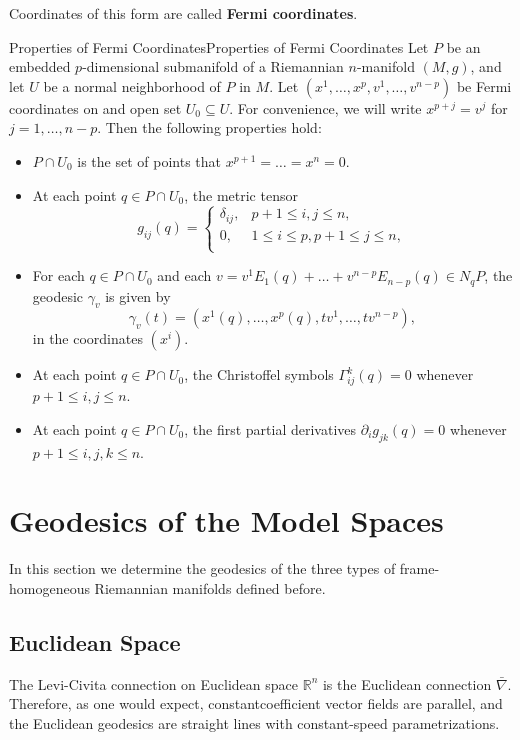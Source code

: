 \documentclass[../main.tex]{subfiles}
\begin{document}
Coordinates of this form are called \textbf{Fermi coordinates}.

\begin{proposition}{Properties of Fermi Coordinates}{Properties of Fermi Coordinates}
	Let $P$ be an embedded $p$-dimensional submanifold of a Riemannian $n$-manifold $(M, g)$, and let $U$ be a normal neighborhood of $P$ in $M$. Let $(x^1, \ldots , x^p, v^1, \ldots, v^{n-p})$ be Fermi coordinates on and open set $U_0 \subseteq U$. For convenience, we will write $x^{p+j} = v^j$ for $j = 1, \ldots, n-p$. Then the following properties hold:
	\begin{itemize}
		\item $P \cap U_0$ is the set of points that $x^{p+1} = \ldots = x^n = 0$.
		\item At each point $q \in P \cap U_0$, the metric tensor
			\begin{equation}
				g_{ij}(q) = \begin{cases}
					\delta_{ij}, & p+1 \leq i, j \leq n, \\
					0, & 1 \leq i \leq p, p+1 \leq j \leq n, \\
				\end{cases}
			\end{equation}
		\item For each $q \in P \cap U_0$ and each $v = v^1 E_1(q) + \ldots + v^{n-p} E_{n-p}(q) \in N_q P$, the geodesic $\gamma_v$ is given by
			\begin{equation}
				\gamma_v(t) = (x^1(q), \ldots, x^p(q), t v^1, \ldots, t v^{n-p}),
			\end{equation}
			in the coordinates $(x^i)$.
		\item At each point $q \in P \cap U_0$, the Christoffel symbols $\Gamma_{ij}^k(q) = 0$ whenever $p+1 \leq i, j \leq n$.
		\item At each point $q \in P \cap U_0$, the first partial derivatives $\partial_i g_{jk}(q) = 0$ whenever $p+1 \leq i, j, k \leq n$.
	\end{itemize}
\end{proposition}

\section{Geodesics of the Model Spaces}
In this section we determine the geodesics of the three types of frame-homogeneous Riemannian manifolds defined before.

\subsection{Euclidean Space}
The Levi-Civita connection on Euclidean space $\mathbb{R}^n$ is the Euclidean connection $\bar{\nabla}$. Therefore, as one would expect, constantcoefficient vector fields are parallel, and the Euclidean geodesics are straight lines with constant-speed parametrizations.
\end{document}
